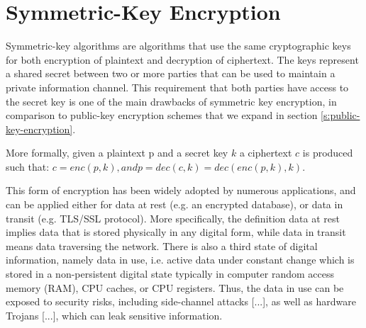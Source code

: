 \section{Symmetric-Key Encryption}\label{s:symmetric-key-encryption}
Symmetric-key algorithms are algorithms that use the same cryptographic keys for both encryption of plaintext and decryption of ciphertext.
The keys represent a shared secret between two or more parties that can be used to maintain a private information channel.
This requirement that both parties have access to the secret key is one of the main drawbacks of symmetric key encryption, in comparison to public-key encryption schemes that we expand in section \ref{s:public-key-encryption}.

More formally, given a plaintext p and a secret key $k$ a ciphertext $c$ is produced such that:
$c = enc(p, k), and p = dec(c, k) = dec(enc(p, k), k).$

This form of encryption has been widely adopted by numerous applications, and can be applied either for data at rest (e.g. an encrypted database), or data in transit (e.g. TLS/SSL protocol).
More specifically, the definition data at rest implies data that is stored physically in any digital form, while data in transit means data traversing the network.
There is also a third state of digital information, namely data in use, i.e. active data under constant change which is stored in a non-persistent digital state typically in computer random access memory (RAM), CPU caches, or CPU registers.
Thus, the data in use can be exposed to security risks, including side-channel attacks [...], as well as hardware Trojans [...], which can leak sensitive information.
